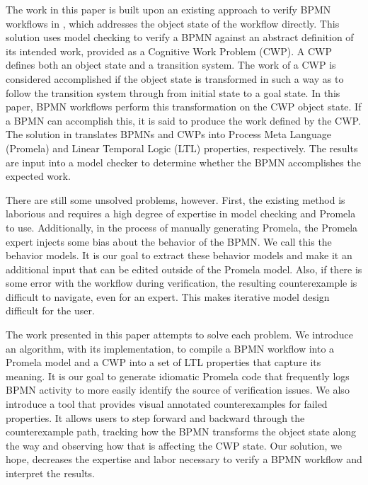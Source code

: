 The work in this paper is built upon an existing approach to verify BPMN workflows in \cite{mercer22}, which addresses the object state of the workflow directly. This solution uses model checking to verify a BPMN against an abstract definition of its intended work, provided as a Cognitive Work Problem (CWP). A CWP defines both an object state and a transition system. The work of a CWP is considered accomplished if the object state is transformed in such a way as to follow the transition system through from initial state to a goal state. In this paper, BPMN workflows perform this transformation on the CWP object state. If a BPMN can accomplish this, it is said to produce the work defined by the CWP. The solution in \cite{mercer22} translates BPMNs and CWPs into Process Meta Language \cite{promelaManual} (Promela) and Linear Temporal Logic \cite{ltl}  (LTL) properties, respectively. The results are input into a model checker to determine whether the BPMN accomplishes the expected work. 

There are still some unsolved problems, however. First, the existing method is laborious and requires a high degree of expertise in model checking and Promela to use. Additionally, in the process of manually generating Promela, the Promela expert injects some bias about the behavior of the BPMN. We call this the behavior models. It is our goal to extract these behavior models and make it an additional input that can be edited outside of the Promela model. Also, if there is some error with the workflow during verification, the resulting counterexample is difficult to navigate, even for an expert. This makes iterative model design difficult for the user. 

The work presented in this paper attempts to solve each problem. We introduce an algorithm, with its implementation, to compile a BPMN workflow into a Promela model and a CWP into a set of LTL properties that capture its meaning. It is our goal to generate idiomatic Promela code that frequently logs BPMN activity to more easily identify the source of verification issues. We also introduce a tool that provides visual annotated counterexamples for failed properties. It allows users to step forward and backward through the counterexample path, tracking how the BPMN transforms the object state along the way and observing how that is affecting the CWP state. Our solution, we hope, decreases the expertise and labor necessary to verify a BPMN workflow and interpret the results. 

\begin{comment}
This work progresses the path toward high-integrity LC/NC solution designs by automating a process which allows BPMN models to be verified against a CWP. The CWP has two parts, an object state and a state machine; the former connects it to the BPMN workflow model. The goal of the verification process is to test whether the BPMN workflow can manipulate the object state toward any of the final states specified by the CWP state machine. Verification must also ensure that the BPMN workflow uses only allowed transitions to reach a final state.
\end{comment}

